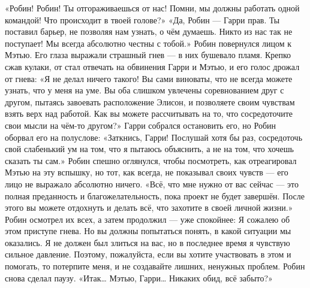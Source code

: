 \documentclass[a4paper,12pt]{book}
\begin{document}
	«Робин! Робин! Ты отгораживаешься от нас! Помни, мы должны работать одной командой! Что происходит в твоей голове?»
	«Да, Робин — Гарри прав. Ты поставил барьер, не позволяя нам узнать, о чём думаешь. Никто из нас так не поступает! Мы всегда абсолютно честны с тобой.»
	Робин повернулся лицом к Мэтью. Его глаза выражали страшный гнев — в них бушевало пламя. Крепко сжав кулаки, от стал отвечать на обвинения Гарри и Мэтью, и его голос дрожал от гнева:
	«Я не делал ничего такого! Вы сами виноваты, что не всегда можете узнать, что у меня на уме. Вы оба слишком увлечены соревнованием друг с другом, пытаясь завоевать расположение Элисон, и позволяете своим чувствам взять верх над работой. Как вы можете рассчитывать на то, что сосредоточите свои мысли на чём-то другом?»
	Гарри собрался остановить его, но Робин оборвал его на полуслове:
	«Заткнись, Гарри! Послушай хотя бы раз, сосредоточь свой слабенький ум на том, что я пытаюсь объяснить, а не на том, что хочешь сказать ты сам.»
	Робин спешно оглянулся, чтобы посмотреть, как отреагировал Мэтью на эту вспышку, но тот, как всегда, не показывал своих чувств — его лицо не выражало абсолютно ничего.
	«Всё, что мне нужно от вас сейчас — это полная преданность и благожелательность, пока проект не будет завершён. После этого вы можете отдохнуть и делать всё, что захотите в своей личной жизни.»
	 Робин осмотрел их всех, а затем продолжил — уже спокойнее:
	Я сожалею об этом приступе гнева. Но вы должны попытаться понять, в какой ситуации мы оказались. Я не должен был злиться на вас, но в последнее время я чувствую сильное давление. Поэтому, пожалуйста, если вы хотите участвовать в этом и помогать, то потерпите меня, и не создавайте лишних, ненужных проблем.
	Робин снова сделал паузу.
	«Итак… Мэтью, Гарри… Никаких обид, всё забыто?»
\end{document}
